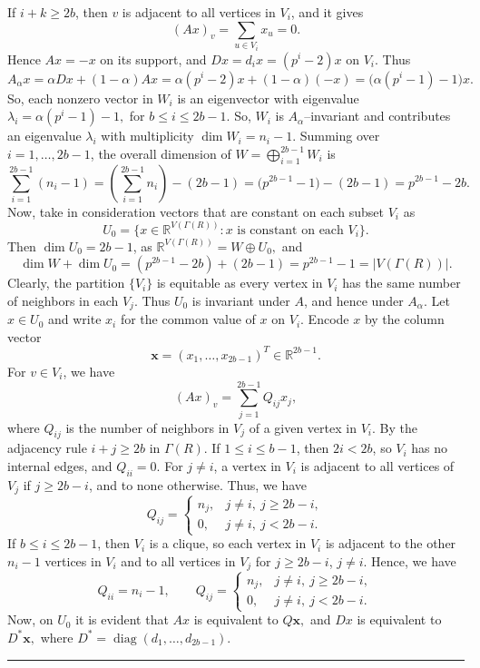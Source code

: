 \documentclass[12pt,twoside]{article}
\renewenvironment{proof}{{\noindent\bfseries Proof.}}{\qed}
\def\qed{\nolinebreak\hfill\rule{.2cm}{.2cm}\par\addvspace{.5cm}}
\begin{document}
\begin{proof}
	 If $i+k\ge 2b$, then $v$ is adjacent to all vertices in $V_i$, and it gives
	\[
	(Ax)_v = \sum_{u\in V_i} x_u = 0.
	\]
	Hence $Ax=-x$ on its support, and $Dx=d_i x =(p^{ i}-2)x$ on $V_i$. Thus
	\[
	A_\alpha x = \alpha Dx + (1-\alpha)Ax
	= \alpha(p^{ i}-2)x + (1-\alpha)(-x)
	= \bigl(\alpha(p^{ i}-1)-1\bigr)x.
	\]
	So, each nonzero vector in $W_i$ is an eigenvector with eigenvalue $\lambda_i = \alpha(p^{ i}-1)-1,$ for $b\le i\le 2b-1.$	So, $W_i$ is $A_\alpha$--invariant and contributes an eigenvalue $\lambda_i$ with multiplicity $\dim W_i=n_i-1$. Summing over $i=1,\dots,2b-1$, the overall dimension of $W = \bigoplus_{i=1}^{2b-1} W_i$	is
	\[
	\sum_{i=1}^{2b-1}(n_i-1) = \left(\sum_{i=1}^{2b-1}n_i\right) - (2b-1) = \bigl(p^{ 2b-1}-1\bigr) - (2b-1) = p^{ 2b-1} - 2b.
	\]
	Now, take in consideration vectors that are constant on each subset $V_i$ as
	\[
	U_0 = \{x\in\mathbb{R}^{V( \varGamma(R))} : x \text{ is constant on each }V_i\}.
	\]
	Then $\dim U_0 = 2b-1$, as $\mathbb{R}^{V( \varGamma(R))} = W \oplus U_0,$ and 
	\[
	\dim W + \dim U_0 = (p^{ 2b-1}-2b)+(2b-1) = p^{ 2b-1}-1 = |V( \varGamma(R))|.
	\]
	Clearly, the partition $\{V_i\}$ is equitable as every vertex in $V_i$ has the same number
	of neighbors in each $V_j$. Thus $U_0$ is invariant under $A$, and hence under  $A_\alpha$. Let $x\in U_0$ and write $x_i$ for the common value of $x$ on $V_i$. Encode $x$
	by the column vector
	\[
	\mathbf{x} = (x_1,\dots,x_{2b-1})^T \in \mathbb{R}^{2b-1}.
	\]
	For $v\in V_i$, we have
	\[
	(Ax)_v = \sum_{j=1}^{2b-1} Q_{ij} x_j,
	\]
	where $Q_{ij}$ is the number of neighbors in $V_j$ of a given vertex in $V_i$.
	By the adjacency rule $i+j\ge 2b$ in $ \varGamma(R)$.  If $1\le i\le b-1$, then $2i<2b$, so $V_i$ has no internal edges, and $Q_{ii} = 0.$
		For $j\ne i$, a vertex in $V_i$ is adjacent to all vertices of $V_j$ if $j\ge 2b-i$, and to none otherwise. Thus, we have
		\[
		Q_{ij} =
		\begin{cases}
			n_j, & j\ne i,\ j\ge 2b-i,\\[2pt]
			0, & j\ne i,\ j< 2b-i.
		\end{cases}
		\]
		 If $b\le i\le 2b-1$, then $V_i$ is a clique, so each vertex in $V_i$ is adjacent
		to the other $n_i-1$ vertices in $V_i$ and to all vertices in $V_j$ for $j\ge 2b-i$,
		$j\ne i$. Hence, we have
		\[
		Q_{ii} = n_i-1,\qquad
		Q_{ij} =
		\begin{cases}
			n_j, & j\ne i,\ j\ge 2b-i,\\[2pt]
			0, & j\ne i,\ j< 2b-i.
		\end{cases}
		\]
	Now, on $U_0$ it is evident that $Ax  $ is equivalent to $ Q\mathbf{x},$ and $Dx  $ is equivalent to $ D^\ast \mathbf{x},$	where $D^\ast = \operatorname{diag}(d_1,\dots,d_{2b-1})$.

\end{proof}
\end{document}
